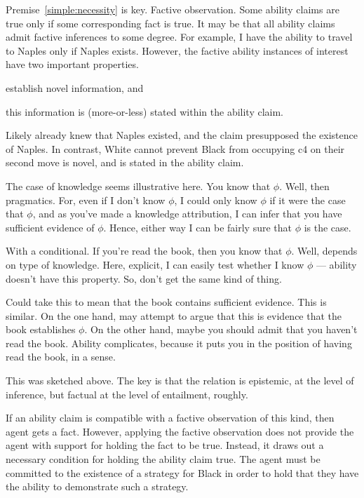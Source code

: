 \documentclass[10pt]{article}
\begin{document}
Premise~\ref{simple:necessity} is key.
Factive observation.
Some ability claims are true only if some corresponding fact is true.
It may be that all ability claims admit factive inferences to some degree.
For example, I have the ability to travel to Naples only if Naples exists.
However, the factive ability instances of interest have two important properties.
\begin{enumerate*}
\item establish novel information, and
\item this information is (more-or-less) stated within the ability claim.
\end{enumerate*}
Likely already knew that Naples existed, and the claim presupposed the existence of Naples.
In contrast, White cannot prevent Black from occupying c4 on their second move is novel, and is stated in the ability claim.

\begin{note}
  The case of knowledge seems illustrative here.
  You know that \(\phi\).
  Well, then pragmatics.
  For, even if I don't know \(\phi\), I could only know \(\phi\) if it were the case that \(\phi\), and as you've made a knowledge attribution, I can infer that you have sufficient evidence of \(\phi\).
  Hence, either way I can be fairly sure that \(\phi\) is the case.

  With a conditional.
  If you're read the book, then you know that \(\phi\).
  Well, depends on type of knowledge.
  Here, explicit, I can easily test whether I know \(\phi\) --- ability doesn't have this property.
  So, don't get the same kind of thing.

  Could take this to mean that the book contains sufficient evidence.
  This is similar.
  On the one hand, may attempt to argue that this is evidence that the book establishes \(\phi\).
  On the other hand, maybe you should admit that you haven't read the book.
  Ability complicates, because it puts you in the position of having read the book, in a sense.
\end{note}

\begin{note}
  This was sketched above.
  The key is that the relation is epistemic, at the level of inference, but factual at the level of entailment, roughly.
\end{note}

If an ability claim is compatible with a factive observation of this kind, then agent gets a fact.
However, applying the factive observation does not provide the agent with support for holding the fact to be true.
Instead, it draws out a necessary condition for holding the ability claim true.
The agent must be committed to the existence of a strategy for Black in order to hold that they have the ability to demonstrate such a strategy.
\end{document}
